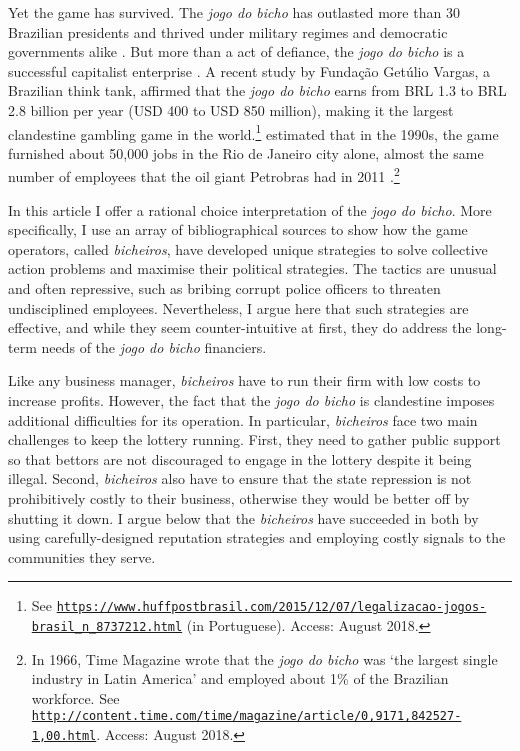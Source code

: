 \documentclass[a4paper,12pt]{article}
\begin{document}
Yet the game has survived. The \textit{jogo do bicho} has outlasted more than 30 Brazilian presidents and thrived under military regimes and democratic governments alike \citep{jupiara2015poroes}. But more than a act of defiance, the \textit{jogo do bicho} is a successful capitalist enterprise \citep{labronici2014sorteio, magalhaes2005ganhou}. A recent study by Fundação Getúlio Vargas, a Brazilian think tank, affirmed that the \textit{jogo do bicho} earns from BRL 1.3 to BRL 2.8 billion per year (USD 400 to USD 850 million), making it the largest clandestine gambling game in the world.\footnote{See \href{https://www.huffpostbrasil.com/2015/12/07/legalizacao-jogos-brasil_n_8737212.html}{\texttt{https://www.huffpostbrasil.com/2015/12/07/legalizacao-jogos-brasil\_n\_8737212.html}} (in Portuguese). Access: August 2018.} \citet[171]{schneider1996brazil} estimated that in the 1990s, the game furnished about 50,000 jobs in the Rio de Janeiro city alone, almost the same number of employees that the oil giant Petrobras had in 2011 \citep{exame2013petrobras}.\footnote{In 1966, Time Magazine wrote that the \textit{jogo do bicho} was `the largest single industry in Latin America' and employed about 1\% of the Brazilian workforce. See \href{http://content.time.com/time/magazine/article/0,9171,842527-1,00.html}{\texttt{http://content.time.com/time/magazine/article/0,9171,842527-1,00.html}}. Access: August 2018.}

In this article I offer a rational choice interpretation of the \textit{jogo do bicho}. More specifically, I use an array of bibliographical sources to show how the game operators, called \textit{bicheiros}, have developed unique strategies to solve collective action problems and maximise their political strategies. The tactics are unusual and often repressive, such as bribing corrupt police officers to threaten undisciplined employees. Nevertheless, I argue here that such strategies are effective, and while they seem counter-intuitive at first, they do address the long-term needs of the \textit{jogo do bicho} financiers. 

Like any business manager, \textit{bicheiros} have to run their firm with low costs to increase profits. However, the fact that the \textit{jogo do bicho} is clandestine imposes additional difficulties for its operation. In particular,  \textit{bicheiros} face two main challenges to keep the lottery running. First, they need to gather public support so that bettors are not discouraged to engage in the lottery despite it being illegal. Second, \textit{bicheiros} also have to ensure that the state repression is not prohibitively costly to their business, otherwise they would be better off by shutting it down. I argue below that the \textit{bicheiros} have succeeded in both by using carefully-designed reputation strategies and employing costly signals to the communities they serve. 
\end{document}
